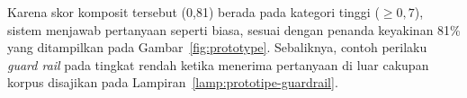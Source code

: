 Karena skor komposit tersebut (0{,}81) berada pada kategori tinggi ($\geq 0{,}7$), sistem menjawab pertanyaan seperti biasa, sesuai dengan penanda keyakinan 81\% yang ditampilkan pada Gambar~\ref{fig:prototype}. Sebaliknya, contoh perilaku \textit{guard rail} pada tingkat rendah ketika menerima pertanyaan di luar cakupan korpus disajikan pada Lampiran~\ref{lamp:prototipe-guardrail}.
